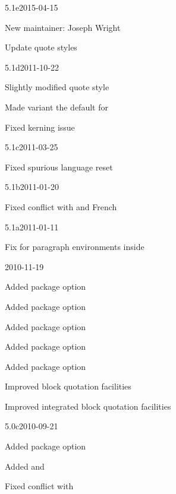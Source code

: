 \documentclass{ltxdockit}[2010/09/26]
\begin{document}
\begin{changelog}

\begin{release}{5.1e}{2015-04-15}
\item New maintainer: Joseph Wright
\item Update  quote styles
\end{release}

\begin{release}{5.1d}{2011-10-22}
\item Slightly modified quote style 
\item Made variant  the default for 
\item Fixed \xetex kerning issue
\end{release}

\begin{release}{5.1c}{2011-03-25}
\item Fixed spurious language reset
\end{release}

\begin{release}{5.1b}{2011-01-20}
\item Fixed conflict with  and French
\end{release}

\begin{release}{5.1a}{2011-01-11}
\item Fix for paragraph environments inside 
\end{release}

\begin{release}{5.1}{2010-11-19}
\item Added package option 
\item Added package option 
\item Added package option 
\item Added package option 
\item Added package option 
\item Improved block quotation facilities
\item Improved integrated block quotation facilities
\end{release}

\begin{release}{5.0c}{2010-09-21}
\item Added package option 
\item Added  and 
\item Fixed conflict with 
\end{release}


\end{changelog}
\end{document}
